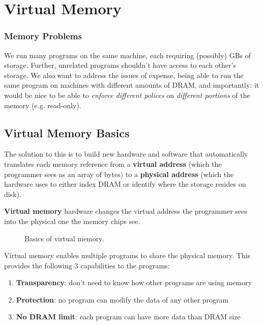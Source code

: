\chapter{Virtual Memory}
\subsection{Memory Problems}
We run many programs on the same machine, each requiring (possibly) GBs of storage. Further, unrelated programs shouldn't have access to each other's storage. We also want to address the issues of expense, being able to run the same program on machines with different amounts of DRAM, and importantly: it would be nice to be able to \emph{enforce different polices} on \emph{different portions} of the memory (e.g. read-only).

\section{Virtual Memory Basics}
The solution to this is to build new hardware and software that automatically translates each memory reference from a \textbf{virtual address} (which the programmer sees as an array of bytes) to a \textbf{physical address} (which the hardware uses to either index DRAM or identify where the storage resides on disk).

\begin{definition}
  \textbf{Virtual memory} hardware changes the virtual address the programmer sees into the physical one the memory chips see.
  \begin{figure}[H]
    \centering
    \caption{Basics of virtual memory.}
    \label{fig:virmembasic}
  \end{figure}
\end{definition}

Virtual memory enables multiple programs to share the physical memory. This provides the following 3 capabilities to the programs:
\begin{enumerate}
  \item \textbf{Transparency}: don't need to know how other programs are using memory
  \item \textbf{Protection}: no program can modify the data of any other program
  \item \textbf{No DRAM limit}: each program can have more data than DRAM size
\end{enumerate}


